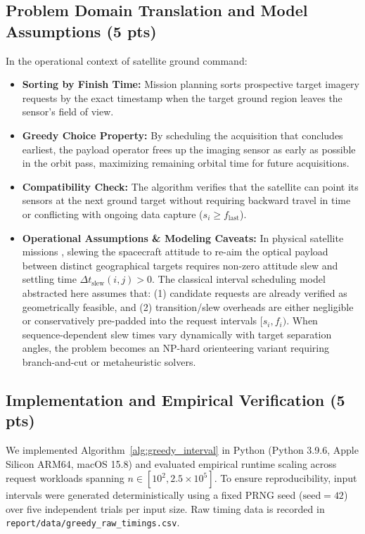 \subsection{Problem Domain Translation and Model Assumptions (5 pts)}
In the operational context of satellite ground command:
\begin{itemize}
    \item \textbf{Sorting by Finish Time:} Mission planning sorts prospective target imagery requests by the exact timestamp when the target ground region leaves the sensor's field of view.
    \item \textbf{Greedy Choice Property:} By scheduling the acquisition that concludes earliest, the payload operator frees up the imaging sensor as early as possible in the orbit pass, maximizing remaining orbital time for future acquisitions.
    \item \textbf{Compatibility Check:} The algorithm verifies that the satellite can point its sensors at the next ground target without requiring backward travel in time or conflicting with ongoing data capture ($s_i \ge f_{\text{last}}$).
    \item \textbf{Operational Assumptions \& Modeling Caveats:} In physical satellite missions \cite{bianchessi2007heuristic}, slewing the spacecraft attitude to re-aim the optical payload between distinct geographical targets requires non-zero attitude slew and settling time $\Delta t_{\text{slew}}(i, j) > 0$. The classical interval scheduling model abstracted here assumes that: (1) candidate requests are already verified as geometrically feasible, and (2) transition/slew overheads are either negligible or conservatively pre-padded into the request intervals $[s_i, f_i)$. When sequence-dependent slew times vary dynamically with target separation angles, the problem becomes an NP-hard orienteering variant requiring branch-and-cut or metaheuristic solvers.
\end{itemize}

\subsection{Implementation and Empirical Verification (5 pts)}
We implemented Algorithm~\ref{alg:greedy_interval} in Python (Python 3.9.6, Apple Silicon ARM64, macOS 15.8) and evaluated empirical runtime scaling across request workloads spanning $n \in [10^2, 2.5 \times 10^5]$. To ensure reproducibility, input intervals were generated deterministically using a fixed PRNG seed ($\text{seed} = 42$) over five independent trials per input size. Raw timing data is recorded in \texttt{report/data/greedy\_raw\_timings.csv}.

